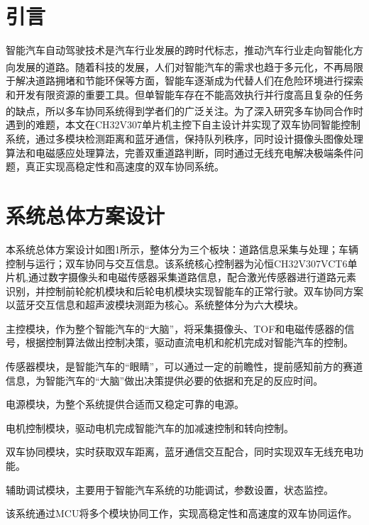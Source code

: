 \documentclass{article}%
\begin{document}
	\begin{multicols}{2}%
		
		
		\section{引言}%
		智能汽车自动驾驶技术是汽车行业发展的跨时代标志，推动汽车行业走向智能化方向发展的道路\textsuperscript{\cite{ref1}}。随着科技的发展，人们对智能汽车的需求也趋于多元化，不再局限于解决道路拥堵和节能环保等方面，智能车逐渐成为代替人们在危险环境进行探索和开发有限资源的重要工具。但单智能车存在不能高效执行并行度高且复杂的任务的缺点，所以多车协同系统得到学者们的广泛关注\textsuperscript{\cite{ref2}}。为了深入研究多车协同合作时遇到的难题，本文在CH32V307单片机主控下自主设计并实现了双车协同智能控制系统，通过多模块检测距离和蓝牙通信，保持队列秩序，同时设计摄像头图像处理算法和电磁感应处理算法，完善双重道路判断，同时通过无线充电解决极端条件问题，真正实现高稳定性和高速度的双车协同系统。
		
		\section{系统总体方案设计}
		本系统总体方案设计如图1所示，整体分为三个板块：道路信息采集与处理；车辆控制与运行；双车协同与交互信息。该系统核心控制器为沁恒CH32V307VCT6单片机,通过数字摄像头和电磁传感器采集道路信息，配合激光传感器进行道路元素识别，并控制前轮舵机模块和后轮电机模块实现智能车的正常行驶。双车协同方案以蓝牙交互信息和超声波模块测距为核心。系统整体分为六大模块。	
		
		主控模块，作为整个智能汽车的“大脑”，将采集摄像头、TOF和电磁传感器的信号，根据控制算法做出控制决策，驱动直流电机和舵机完成对智能汽车的控制。
			 
		传感器模块，是智能汽车的“眼睛”，可以通过一定的前瞻性，提前感知前方的赛道信息，为智能汽车的“大脑”做出决策提供必要的依据和充足的反应时间。 		
			
		电源模块，为整个系统提供合适而又稳定可靠的电源。
							
		电机控制模块，驱动电机完成智能汽车的加减速控制和转向控制。 
				
		双车协同模块，实时获取双车距离，蓝牙通信交互配合，同时实现双车无线充电功能。 	
				
		辅助调试模块，主要用于智能汽车系统的功能调试，参数设置，状态监控。
		
		该系统通过MCU将多个模块协同工作，实现高稳定性和高速度的双车协同运作。
		

\end{multicols}
\end{document}
